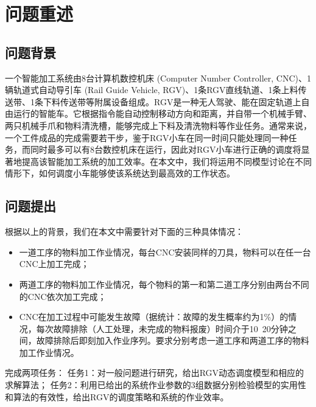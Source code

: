\documentclass{cumcmthesis}
\begin{document}
\begin{abstract}

\end{abstract}

\tableofcontents

\section{问题重述}
\subsection{问题背景}
一个智能加工系统由8台计算机数控机床 (Computer Number Controller, CNC)、1辆轨道式自动导引车 (Rail Guide Vehicle, RGV)、1条RGV直线轨道、1条上料传送带、1条下料传送带等附属设备组成。RGV是一种无人驾驶、能在固定轨道上自由运行的智能车。它根据指令能自动控制移动方向和距离，并自带一个机械手臂、两只机械手爪和物料清洗槽，能够完成上下料及清洗物料等作业任务。\cite{Saiti}通常来说，一个工件成品的完成需要若干步，鉴于RGV小车在同一时间只能处理同一种任务，而同时最多可以有8台数控机床在运行，因此对RGV小车进行正确的调度将显著地提高该智能加工系统的加工效率。在本文中，我们将运用不同模型讨论在不同情形下，如何调度小车能够使该系统达到最高效的工作状态。

\subsection{问题提出}
根据以上的背景，我们在本文中需要针对下面的三种具体情况：

\begin{itemize}
    \item 一道工序的物料加工作业情况，每台CNC安装同样的刀具，物料可以在任一台CNC上加工完成；
    \item 两道工序的物料加工作业情况，每个物料的第一和第二道工序分别由两台不同的CNC依次加工完成；
    \item CNC在加工过程中可能发生故障（据统计：故障的发生概率约为1\%）的情况，每次故障排除（人工处理，未完成的物料报废）时间介于10~20分钟之间，故障排除后即刻加入作业序列。要求分别考虑一道工序和两道工序的物料加工作业情况。
\end{itemize}

完成两项任务：\newline
任务1：对一般问题进行研究，给出RGV动态调度模型和相应的求解算法；\newline
任务2：利用已给出的系统作业参数的3组数据分别检验模型的实用性和算法的有效性，给出RGV的调度策略和系统的作业效率。
\end{document}
